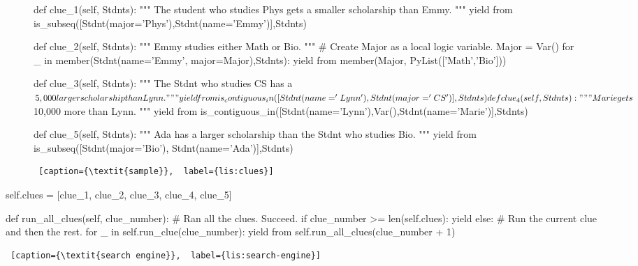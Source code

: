 \begin{figure*}[htb]
\flushright
\begin{minipage}[c]{0.95\textwidth}
\begin{python1}
def clue_1(self, Stdnts):
  """ The student who studies Phys gets a smaller scholarship than Emmy. """
  yield from is_subseq([Stdnt(major='Phys'),Stdnt(name='Emmy')],Stdnts)

def clue_2(self, Stdnts):
  """ Emmy studies either Math or Bio. """
  # Create Major as a local logic variable.
  Major = Var()
  for _ in member(Stdnt(name='Emmy', major=Major),Stdnts):
    yield from member(Major, PyList(['Math','Bio'])) 
  
def clue_3(self, Stdnts):
  """ The Stdnt who studies CS has a $5,000 larger scholarship than Lynn. """
  yield from is_contiguous_in([Stdnt(name='Lynn'), Stdnt(major='CS')], Stdnts)
  
def clue_4(self, Stdnts):
  """ Marie gets $10,000 more than Lynn. """
  yield from is_contiguous_in([Stdnt(name='Lynn'),Var(),Stdnt(name='Marie')],Stdnts)
  
def clue_5(self, Stdnts):
  """ Ada has a larger scholarship than the Stdnt who studies Bio. """
  yield from is_subseq([Stdnt(major='Bio'), Stdnt(name='Ada')],Stdnts)
\end{python1}\linv
\begin{lstlisting} [caption={\textit{sample}},  label={lis:clues}]
\end{lstlisting}
\end{minipage}\linv
\end{figure*}

\begin{center}
\begin{minipage}[c]{0.46\textwidth}
\begin{python1}
self.clues = [clue_1, clue_2, clue_3, clue_4, clue_5] 

def run_all_clues(self, clue_number):
  # Ran all the clues. Succeed.
  if clue_number >= len(self.clues): yield
  else:
    # Run the current clue and then the rest.
    for _ in self.run_clue(clue_number):
      yield from self.run_all_clues(clue_number + 1)
\end{python1}\linv
\begin{lstlisting} [caption={\textit{search engine}},  label={lis:search-engine}]
\end{lstlisting}
\end{minipage}
\end{center}

